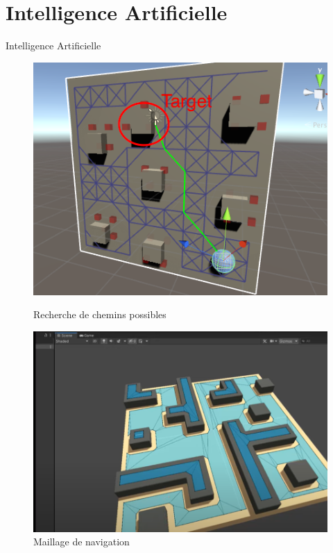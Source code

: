 \section{Intelligence Artificielle}

\begin{frame}{Intelligence Artificielle}

\begin{figure}[H]
\centering
\begin{minipage}{.5\textwidth}
  \centering
  \includegraphics[width=.9\linewidth]{img/path.png}
  \caption{Recherche de chemins possibles}
  \label{fig:houses}
\end{minipage}%
\begin{minipage}{.5\textwidth}
  \centering
  \includegraphics[width=.9\linewidth]{img/navmesh.PNG}
  \caption{Maillage de navigation}
  \label{fig:military}
\end{minipage}
\end{figure}

\end{frame}